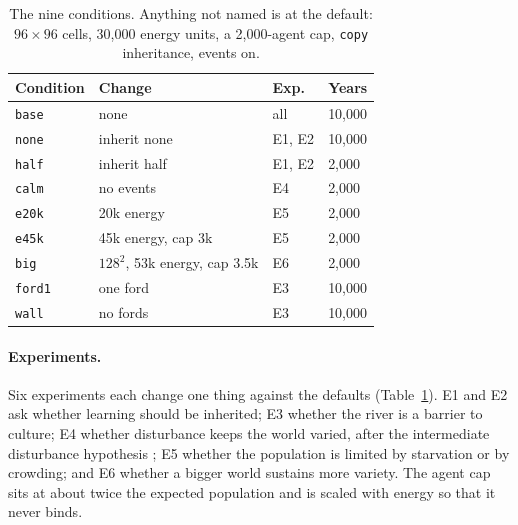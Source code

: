 \documentclass[letterpaper]{article}
\newcommand{\cond}[1]{\texttt{#1}}
\begin{document}
\begin{table}[t]
\centering
\footnotesize
\caption{The nine conditions. Anything not named is at the default: $96\times96$ cells, 30,000
energy units, a 2,000-agent cap, \cond{copy} inheritance, events on.}
\label{tab:conditions}
\begin{tabular}{@{}llll@{}}
\toprule
Condition & Change & Exp. & Years \\
\midrule
\cond{base}  & none                                 & all     & 10,000 \\
\cond{none}  & inherit none                         & E1, E2  & 10,000 \\
\cond{half}  & inherit half                         & E1, E2  & 2,000 \\
\cond{calm}  & no events                            & E4      & 2,000 \\
\cond{e20k}  & 20k energy                           & E5      & 2,000 \\
\cond{e45k}  & 45k energy, cap 3k                   & E5      & 2,000 \\
\cond{big}   & $128^2$, 53k energy, cap 3.5k        & E6      & 2,000 \\
\cond{ford1} & one ford                             & E3      & 10,000 \\
\cond{wall}  & no fords                             & E3      & 10,000 \\
\bottomrule
\end{tabular}
\end{table}

\paragraph{Experiments.} Six experiments each change one thing against the defaults
(Table~\ref{tab:conditions}). E1 and E2 ask whether learning should be inherited; E3 whether the river
is a barrier to culture; E4 whether disturbance keeps the world varied, after the intermediate
disturbance hypothesis \citep{connell1978}; E5 whether the population is limited by starvation or by
crowding; and E6 whether a bigger world sustains more variety. The agent cap sits at about twice the
expected population and is scaled with energy so that it never binds.
\end{document}
